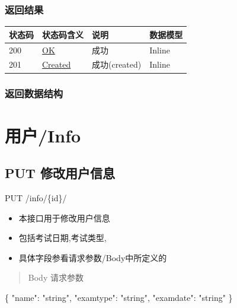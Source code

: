 \documentclass[
]{article}
\newenvironment{Shaded}{}{}
\newcommand{\DataTypeTok}[1]{\textcolor[rgb]{0.56,0.13,0.00}{#1}}
\newcommand{\FunctionTok}[1]{\textcolor[rgb]{0.02,0.16,0.49}{#1}}
\newcommand{\StringTok}[1]{\textcolor[rgb]{0.25,0.44,0.63}{#1}}
\begin{document}
\hypertarget{ux8fd4ux56deux7ed3ux679c-21}{%
\subsubsection{返回结果}\label{ux8fd4ux56deux7ed3ux679c-21}}

\begin{longtable}[]{@{}llll@{}}
\toprule
状态码 & 状态码含义 & 说明 & 数据模型 \\
\midrule
\endhead
200 & \href{https://tools.ietf.org/html/rfc7231\#section-6.3.1}{OK} &
成功 & Inline \\
201 & \href{https://tools.ietf.org/html/rfc7231\#section-6.3.2}{Created}
& 成功(created) & Inline \\
\bottomrule
\end{longtable}

\hypertarget{ux8fd4ux56deux6570ux636eux7ed3ux6784-17}{%
\subsubsection{返回数据结构}\label{ux8fd4ux56deux6570ux636eux7ed3ux6784-17}}

\hypertarget{ux7528ux6237info}{%
\section{用户/Info}\label{ux7528ux6237info}}

\hypertarget{put-ux4feeux6539ux7528ux6237ux4fe1ux606f}{%
\subsection{PUT
修改用户信息}\label{put-ux4feeux6539ux7528ux6237ux4fe1ux606f}}

PUT /info/\{id\}/

\begin{itemize}
\item
  本接口用于修改用户信息
\item
  包括考试日期,考试类型,
\item
  具体字段参看请求参数/Body中所定义的
\end{itemize}

\begin{quote}
Body 请求参数
\end{quote}

\begin{Shaded}
\begin{Highlighting}[]
\FunctionTok{\{}
  \DataTypeTok{"name"}\FunctionTok{:} \StringTok{"string"}\FunctionTok{,}
  \DataTypeTok{"examtype"}\FunctionTok{:} \StringTok{"string"}\FunctionTok{,}
  \DataTypeTok{"examdate"}\FunctionTok{:} \StringTok{"string"}
\FunctionTok{\}}
\end{Highlighting}
\end{Shaded}
\end{document}
